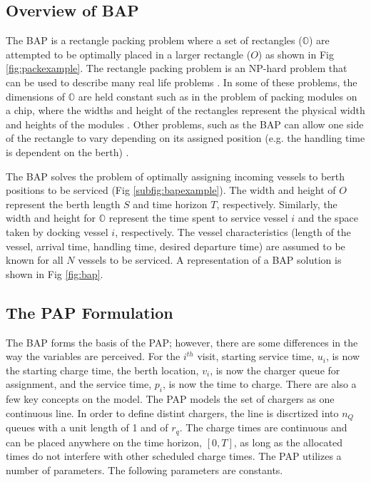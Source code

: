 \documentclass[utf8]{FrontiersinHarvard}
\let\cite\citep                                                                 %
\begin{document}
\subsection{Overview of BAP}
The BAP is a rectangle packing problem where a set
of rectangles ($\mathbb{O}$) are attempted to be optimally placed in a larger rectangle ($O$) as shown in Fig
\ref{fig:packexample}. The rectangle packing problem is an NP-hard problem that can be used to describe many real life
problems \cite{Bruin2013,Murata1995}. In some of these problems, the dimensions of $\mathbb{O}$ are held constant such
as in the problem of packing modules on a chip, where the widths and height of the rectangles represent the physical
width and heights of the modules \cite{Murata1995}. Other problems, such as the BAP can allow one side of
the rectangle to vary depending on its assigned position (e.g. the handling time is dependent on the berth)
\cite{Buhrkal2010}.

The BAP solves the problem of optimally assigning incoming vessels to berth positions to be serviced (Fig
\ref{subfig:bapexample}). The width and height of $O$ represent the berth length $S$ and time horizon $T$, respectively.
Similarly, the width and height for $\mathbb{O}$ represent the time spent to service vessel $i$ and the space taken by
docking vessel $i$, respectively. The vessel characteristics (length of the vessel, arrival time, handling time, desired
departure time) are assumed to be known for all $N$ vessels to be serviced. A representation of a BAP solution is shown
in Fig \ref{fig:bap}.

\subsection{The PAP Formulation}
The BAP forms the basis of the PAP; however, there are some differences in the way the variables are
perceived. For the $i^{th}$ visit, starting service time, $u_i$, is now the starting charge time, the berth location,
$v_i$, is now the charger queue for assignment, and the service time, $p_i$, is now the time to charge. There are also a few
key concepts on the model. The PAP models the set of chargers as one continuous line. In order to define distint chargers, the 
line is discrtized into $n_Q$ queues with a unit length of 1 and  of $r_q$. The charge times are continuous and 
can be placed anywhere on the time horizon, $[0,T]$, as long as the allocated times do not interfere with other scheduled charge times.
The PAP utilizes a number of parameters. The following parameters are constants. 
\end{document}
